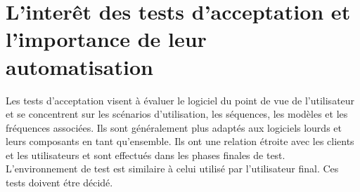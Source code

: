 \section[les tests d'acceptation et l'automatisation]{L'interêt des tests d'acceptation et l'importance de leur automatisation}
Les tests d'acceptation visent à évaluer le logiciel du point de vue de l'utilisateur et se concentrent sur les scénarios d'utilisation, les séquences, les modèles et les fréquences associées. Ils sont généralement plus adaptés aux logiciels lourds et leurs composants en tant qu'ensemble. Ils ont une relation étroite avec les clients et les utilisateurs et sont effectués dans les phases finales de test. L'environnement de test est similaire à celui utilisé par l'utilisateur final. Ces tests doivent étre décidé. 



